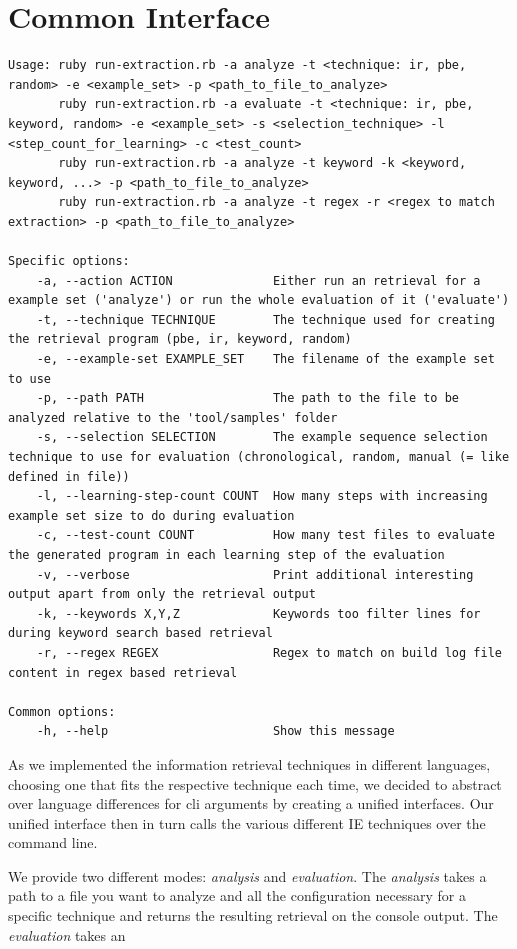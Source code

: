 \documentclass[\myrootdir/main.tex]{subfiles}
\begin{document}
\section{Common Interface}
\begin{lstlisting}
Usage: ruby run-extraction.rb -a analyze -t <technique: ir, pbe, random> -e <example_set> -p <path_to_file_to_analyze>
       ruby run-extraction.rb -a evaluate -t <technique: ir, pbe, keyword, random> -e <example_set> -s <selection_technique> -l <step_count_for_learning> -c <test_count>
       ruby run-extraction.rb -a analyze -t keyword -k <keyword, keyword, ...> -p <path_to_file_to_analyze>
       ruby run-extraction.rb -a analyze -t regex -r <regex to match extraction> -p <path_to_file_to_analyze>

Specific options:
    -a, --action ACTION              Either run an retrieval for a example set ('analyze') or run the whole evaluation of it ('evaluate')
    -t, --technique TECHNIQUE        The technique used for creating the retrieval program (pbe, ir, keyword, random)
    -e, --example-set EXAMPLE_SET    The filename of the example set to use
    -p, --path PATH                  The path to the file to be analyzed relative to the 'tool/samples' folder
    -s, --selection SELECTION        The example sequence selection technique to use for evaluation (chronological, random, manual (= like defined in file))
    -l, --learning-step-count COUNT  How many steps with increasing example set size to do during evaluation
    -c, --test-count COUNT           How many test files to evaluate the generated program in each learning step of the evaluation
    -v, --verbose                    Print additional interesting output apart from only the retrieval output
    -k, --keywords X,Y,Z             Keywords too filter lines for during keyword search based retrieval
    -r, --regex REGEX                Regex to match on build log file content in regex based retrieval

Common options:
    -h, --help                       Show this message
\end{lstlisting}
As we implemented the information retrieval techniques in different languages, choosing one that fits the respective technique each time, we decided to abstract over language differences for cli arguments by creating a unified interfaces. Our unified interface then in turn calls the various different IE techniques over the command line.

We provide two different modes: \emph{analysis} and \emph{evaluation}.
The \emph{analysis} takes a path to a file you want to analyze and all the configuration necessary for a specific technique and returns the resulting retrieval on the console output. The \emph{evaluation} takes an 
\end{document}
